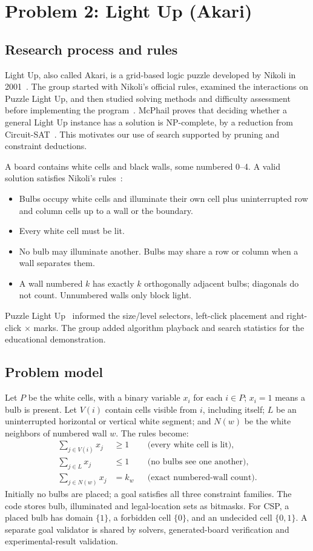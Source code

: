 \section{Problem 2: Light Up (Akari)}
\subsection{Research process and rules}
Light Up, also called Akari, is a grid-based logic puzzle developed by Nikoli
in 2001~\cite{akari-rules}. The group started with Nikoli's official rules,
examined the interactions on Puzzle Light Up, and then studied solving methods
and difficulty assessment before implementing the program~\cite{akari-rules,lightup}.
McPhail proves that deciding whether a general Light Up instance has a solution
is NP-complete, by a reduction from Circuit-SAT~\cite{akari-np}. This motivates
our use of search supported by pruning and constraint deductions.

A board contains white cells and black walls, some numbered 0--4. A valid
solution satisfies Nikoli's rules~\cite{akari-rules}:
\begin{itemize}
\item Bulbs occupy white cells and illuminate their own cell plus uninterrupted
row and column cells up to a wall or the boundary.
\item Every white cell must be lit.
\item No bulb may illuminate another. Bulbs may share a row or column when a wall separates them.
\item A wall numbered $k$ has exactly $k$ orthogonally adjacent bulbs; diagonals
do not count. Unnumbered walls only block light.
\end{itemize}
Puzzle Light Up~\cite{lightup} informed the size/level selectors, left-click
placement and right-click $\times$ marks. The group added algorithm playback
and search statistics for the educational demonstration.

\subsection{Problem model}
Let $P$ be the white cells, with a binary variable $x_i$ for each $i\in P$;
$x_i=1$ means a bulb is present. Let $V(i)$ contain cells visible from $i$,
including itself; $L$ be an uninterrupted horizontal or vertical white segment;
and $N(w)$ be the white neighbors of numbered wall $w$. The rules become:
\begin{align*}
\sum_{j\in V(i)}x_j &\geq 1 &&\text{(every white cell is lit)},\\
\sum_{j\in L}x_j &\leq 1 &&\text{(no bulbs see one another)},\\
\sum_{j\in N(w)}x_j &= k_w &&\text{(exact numbered-wall count)}.
\end{align*}
Initially no bulbs are placed; a goal satisfies all three constraint families.
The code stores bulb, illuminated and legal-location sets as bitmasks. For CSP,
a placed bulb has domain $\{1\}$, a forbidden cell $\{0\}$, and an undecided
cell $\{0,1\}$. A separate goal validator is shared by solvers, generated-board
verification and experimental-result validation.

